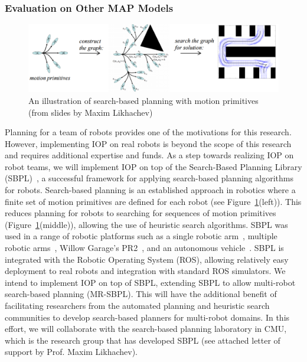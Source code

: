 \documentclass[11pt]{article}
\begin{document}
\subsubsection{Evaluation on Other MAP Models}

\begin{figure}[t]
\centering
\includegraphics[width=0.8\columnwidth]{MotionPrimitives_cropped2} 
\vspace{-0.4cm}
 \caption{An illustration of search-based planning with motion primitives (from slides by Maxim Likhachev)} \label{fig:motion-primitives}
\end{figure}


Planning for a team of robots provides one of the motivations for this research. 
However, implementing IOP on real robots is beyond the scope of this research and requires additional expertise and funds. As a step towards realizing IOP on robot teams, we will implement IOP on top of the Search-Based Planning Library (SBPL)~\cite{likhachev2010sbpl}, a successful framework for applying search-based planning algorithms for robots. 
Search-based planning is an established approach in robotics where a finite set of motion primitives are defined for each robot (see Figure~\ref{fig:motion-primitives}(left)). 
This reduces planning for robots to searching for sequences of motion primitives (Figure~\ref{fig:motion-primitives}(middle)), allowing the use of heuristic search algorithms. 
SBPL was used in a range of robotic platforms such as a single robotic arm~\cite{stern2014potential,aine2015learning}, multiple robotic arms~\cite{cohen2014planning}, Willow Garage’s PR2~\cite{phillips2012graphs}, and an autonomous vehicle~\cite{likhachev2009planning}. SBPL is integrated with the Robotic Operating System (ROS), allowing relatively easy deployment to real robots and integration with standard ROS simulators. We intend to implement IOP on top of SBPL, extending SBPL to allow multi-robot search-based planning (MR-SBPL). This will have the additional benefit of facilitating researchers from the automated planning and heuristic search communities to 
develop search-based planners for multi-robot domains. In this effort, we will collaborate with the search-based planning laboratory in CMU, which is the research group that has developed SBPL (see attached letter of support by Prof. Maxim Likhachev). 
\end{document}
